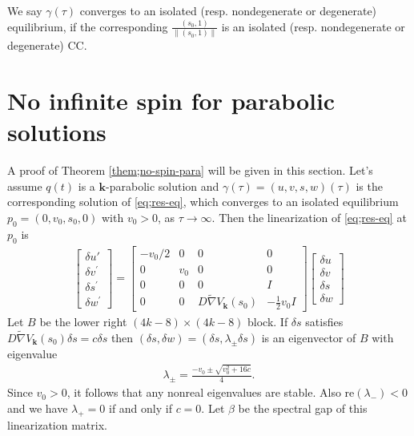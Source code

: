 \documentclass[11pt]{amsart}
\theoremstyle{definition}
\theoremstyle{remark}
\numberwithin{equation}{section}
\newcommand{\gm}{\gamma}
\newcommand{\bk}{\mathbf k}
\begin{document}
 
We say $\gm(\tau)$ converges to an isolated (resp. nondegenerate or degenerate) equilibrium, if the corresponding $\frac{(s_0, 1)}{\| (s_0, 1)\|}$ is an isolated (resp. nondegenerate or degenerate) CC. 
 






\section{No infinite spin for parabolic solutions} \label{sec:no_infinite_spin_for_parabolic_solutions}

A proof of Theorem \ref{them;no-spin-para} will be given in this section. Let's assume $q(t)$ is a $\bk$-parabolic solution and $\gm(\tau)=(u, v, s,w)(\tau)$ is the corresponding solution of \eqref{eq;res-eq}, which converges to an isolated equilibrium $p_0=(0, v_0, s_0, 0)$ with $v_0>0$, as $\tau \to \infty$. Then the linearization of \eqref{eq;res-eq} at $p_0$ is
\begin{align} \label{eq;lin}
    \begin{bmatrix}
\delta u'\\
\delta v^\prime\\
\delta s^\prime\\
\delta w^\prime
\end{bmatrix}=
\begin{bmatrix}
   -v_0/2 & 0 & 0 & 0\\
    0 & v_0& 0 &0\\
    0 & 0 & 0 & I\\
    0& 0 & D\tilde{\nabla} V_\mathbf{k}(s_0) & -\frac{1}{2} v_0 I
\end{bmatrix}
\begin{bmatrix}
    \delta u\\
    \delta v\\
    \delta s\\
    \delta w
\end{bmatrix}
\end{align}
Let $B$ be the lower right $(4k-8)\times(4k-8)$ block. If $\delta s$ satisfies $D\tilde{\nabla} V_\mathbf{k}(s_0)\delta s=c\delta s$ then $(\delta s,\delta w)=(\delta s,\lambda_{\pm}\delta s)$ is an eigenvector of $B$ with eigenvalue
\begin{align*}
    \lambda_{\pm}=\frac{-v_0\pm\sqrt{v_0^2+16c}}{4}.
\end{align*}
Since $v_0>0$, it follows that any nonreal eigenvalues are stable. Also $\text{re}(\lambda_{-})<0$ and we have $\lambda_{+}=0$ if and only if $c=0$. Let $\beta$ be the spectral gap of this linearization matrix.
\end{document}
